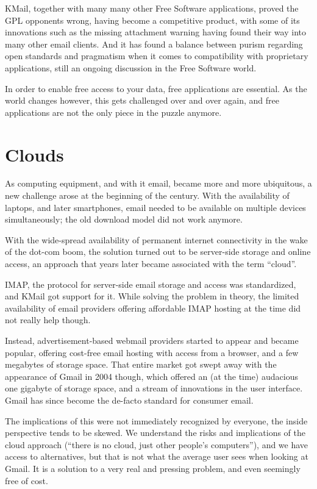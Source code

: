 KMail, together with many many other Free Software applications, proved the GPL opponents wrong, having become a competitive product, with some of its innovations such as the missing attachment warning having found their way into many other email clients. And it has found a balance between purism regarding open standards and pragmatism when it comes to compatibility with proprietary applications, still an ongoing discussion in the Free Software world.

In order to enable free access to your data, free applications are essential. As the world changes however, this gets challenged over and over again, and free applications are not the only piece in the puzzle anymore.

\section*{Clouds}

As computing equipment, and with it email, became more and more ubiquitous, a new challenge arose at the beginning of the century. With the availability of laptops, and later smartphones, email needed to be available on multiple devices simultaneously; the old download model did not work anymore.

With the wide-spread availability of permanent internet connectivity in the wake of the dot-com boom, the solution turned out to be server-side storage and online access, an approach that years later became associated with the term “cloud”.

IMAP, the protocol for server-side email storage and access was standardized, and KMail got support for it. While solving the problem in theory, the limited availability of email providers offering affordable IMAP hosting at the time did not really help though.

Instead, advertisement-based webmail providers started to appear and became popular, offering cost-free email hosting with access from a browser, and a few megabytes of storage space. That entire market got swept away with the appearance of Gmail in 2004 though, which offered an (at the time) audacious one gigabyte of storage space, and a stream of innovations in the user interface. Gmail has since become the de-facto standard for consumer email.

The implications of this were not immediately recognized by everyone, the inside perspective tends to be skewed. We understand the risks and implications of the cloud approach (“there is no cloud, just other people's computers”), and we have access to alternatives, but that is not what the average user sees when looking at Gmail. It is a solution to a very real and pressing problem, and even seemingly free of cost.

